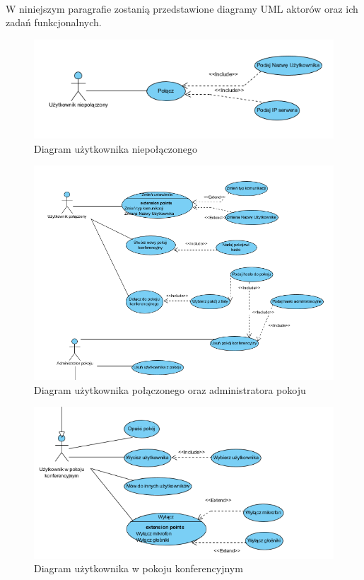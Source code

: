 \documentclass{article}
\begin{document}
	\paragraph{} W niniejszym paragrafie zostanią przedstawione diagramy UML aktorów oraz ich zadań funkcjonalnych.
	\begin{figure}[H]
		\centering
		\includegraphics[scale=0.9]{UserNP}
		\caption[]{Diagram użytkownika niepołączonego}
		\label{fig:DUN}
	\end{figure}
	\begin{figure}[H]
		\centering
		\includegraphics[scale=0.9]{UserPiAdm}
		\caption[]{Diagram użytkownika połączonego oraz administratora pokoju}
		\label{fig:DUP}
	\end{figure}
	\begin{figure}[H]
		\centering
		\includegraphics[scale=0.9]{UserPK}
		\caption[]{Diagram użytkownika w pokoju konferencyjnym}
		\label{fig:DUW}
	\end{figure}
\end{document}
